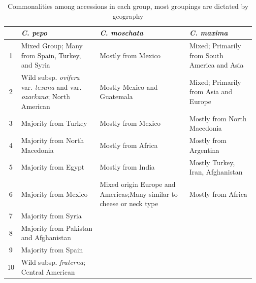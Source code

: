 \documentclass[utf8]{FrontiersinHarvard} %
\begin{document}
\clearpage

\begin{table}[h]
	\begin{center}
	\begin{tabular}{c p{5cm} p{5cm} p{5cm}}
		\hline
& \textbf{\emph{C. pepo}} & \textbf{\emph{C. moschata}} & \textbf{\emph{C. maxima}} \\
\hline
1 & Mixed Group; Many from Spain, Turkey, and Syria & Mostly from Mexico & Mixed; Primarily from South America and Asia \\
2 & Wild subsp. \emph{ovifera} var. \emph{texana} and var. \emph{ozarkana}; North American & Mostly Mexico and Guatemala & Mixed; Primarily from Asia and Europe \\
3 & Majority from Turkey & Mostly from Mexico & Mostly from North Macedonia \\
4 & Majority from North Macedonia & Mostly from Africa & Mostly from Argentina \\
5 & Majority from Egypt & Mostly from India & Mostly Turkey, Iran, Afghanistan \\
6 & Majority from Mexico & Mixed origin Europe and Americas;Many similar to cheese or neck type & Mostly from Africa \\
7 & Majority from Syria & & \\
8 & Majority from Pakistan and Afghanistan & & \\
9 & Majority from Spain & & \\
10 & Wild subsp. \emph{fraterna}; Central American & & \\
\hline
	\end{tabular}
	\caption{Commonalities among accessions in each group, most groupings are dictated by geography \label{tbl:2}}
	\end{center}
\end{table}

\clearpage
\end{document}
